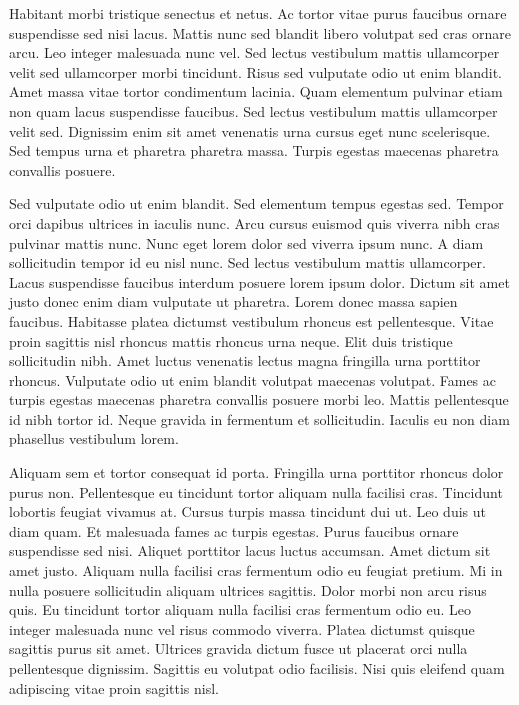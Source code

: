 \documentclass[conference]{IEEEtran}
\begin{document}
Habitant morbi tristique senectus et netus. Ac tortor vitae purus faucibus ornare suspendisse sed nisi lacus. Mattis nunc sed blandit libero volutpat sed cras ornare arcu. Leo integer malesuada nunc vel. Sed lectus vestibulum mattis ullamcorper velit sed ullamcorper morbi tincidunt. Risus sed vulputate odio ut enim blandit. Amet massa vitae tortor condimentum lacinia. Quam elementum pulvinar etiam non quam lacus suspendisse faucibus. Sed lectus vestibulum mattis ullamcorper velit sed. Dignissim enim sit amet venenatis urna cursus eget nunc scelerisque. Sed tempus urna et pharetra pharetra massa. Turpis egestas maecenas pharetra convallis posuere.

Sed vulputate odio ut enim blandit. Sed elementum tempus egestas sed. Tempor orci dapibus ultrices in iaculis nunc. Arcu cursus euismod quis viverra nibh cras pulvinar mattis nunc. Nunc eget lorem dolor sed viverra ipsum nunc. A diam sollicitudin tempor id eu nisl nunc. Sed lectus vestibulum mattis ullamcorper. Lacus suspendisse faucibus interdum posuere lorem ipsum dolor. Dictum sit amet justo donec enim diam vulputate ut pharetra. Lorem donec massa sapien faucibus. Habitasse platea dictumst vestibulum rhoncus est pellentesque. Vitae proin sagittis nisl rhoncus mattis rhoncus urna neque. Elit duis tristique sollicitudin nibh. Amet luctus venenatis lectus magna fringilla urna porttitor rhoncus. Vulputate odio ut enim blandit volutpat maecenas volutpat. Fames ac turpis egestas maecenas pharetra convallis posuere morbi leo. Mattis pellentesque id nibh tortor id. Neque gravida in fermentum et sollicitudin. Iaculis eu non diam phasellus vestibulum lorem.

Aliquam sem et tortor consequat id porta. Fringilla urna porttitor rhoncus dolor purus non. Pellentesque eu tincidunt tortor aliquam nulla facilisi cras. Tincidunt lobortis feugiat vivamus at. Cursus turpis massa tincidunt dui ut. Leo duis ut diam quam. Et malesuada fames ac turpis egestas. Purus faucibus ornare suspendisse sed nisi. Aliquet porttitor lacus luctus accumsan. Amet dictum sit amet justo. Aliquam nulla facilisi cras fermentum odio eu feugiat pretium. Mi in nulla posuere sollicitudin aliquam ultrices sagittis. Dolor morbi non arcu risus quis. Eu tincidunt tortor aliquam nulla facilisi cras fermentum odio eu. Leo integer malesuada nunc vel risus commodo viverra. Platea dictumst quisque sagittis purus sit amet. Ultrices gravida dictum fusce ut placerat orci nulla pellentesque dignissim. Sagittis eu volutpat odio facilisis. Nisi quis eleifend quam adipiscing vitae proin sagittis nisl.
\end{document}
